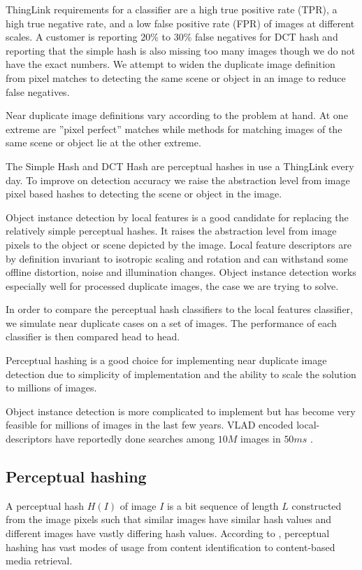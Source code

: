 \documentclass[english,12pt,a4paper,pdftex,elec,utf8]{aaltothesis}
\begin{document}
ThingLink requirements for a classifier are a high true positive rate (TPR), a high true negative rate, and a low false positive rate (FPR) of images at different scales. A customer is reporting 20\% to 30\% false negatives for DCT hash and reporting that the simple hash is also missing too many images though we do not have the exact numbers. We attempt to widen the duplicate image definition from pixel matches to detecting the same scene or object in an image to reduce false negatives.

Near duplicate image definitions vary according to the problem at hand. At one extreme are ''pixel perfect'' matches while methods for matching images of the same scene or object lie at the other extreme.

The Simple Hash and DCT Hash are perceptual hashes in use a ThingLink every day. To improve on detection accuracy we raise the abstraction level from image pixel based hashes to detecting the scene or object in the image.

Object instance detection by local features is a good candidate for replacing the relatively simple perceptual hashes. It raises the abstraction level from image pixels to the object or scene depicted by the image. Local feature descriptors are by definition invariant to isotropic scaling and rotation and can withstand some offline distortion, noise and illumination changes. Object instance detection works especially well for processed duplicate images, the case we are trying to solve.

In order to compare the perceptual hash classifiers to the local features classifier, we simulate near duplicate cases on a set of images. The performance of each classifier is then compared head to head.

Perceptual hashing is a good choice for implementing near duplicate image detection due to simplicity of implementation and the ability to scale the solution to millions of images.

Object instance detection is more complicated to implement but has become very feasible for millions of images in the last few years. VLAD encoded local-descriptors have reportedly done searches among $10M$ images in $50ms$ \cite{Jegou2010}.

\subsection{Perceptual hashing} \label{perceptualhash}
A perceptual hash $H(I)$ of image $I$ is a bit sequence of length $L$ constructed from the image pixels such that similar images have similar hash values and different images have vastly differing hash values. According to \cite{Zauner2010}, perceptual hashing has vast modes of usage from content identification to content-based media retrieval.
\end{document}
